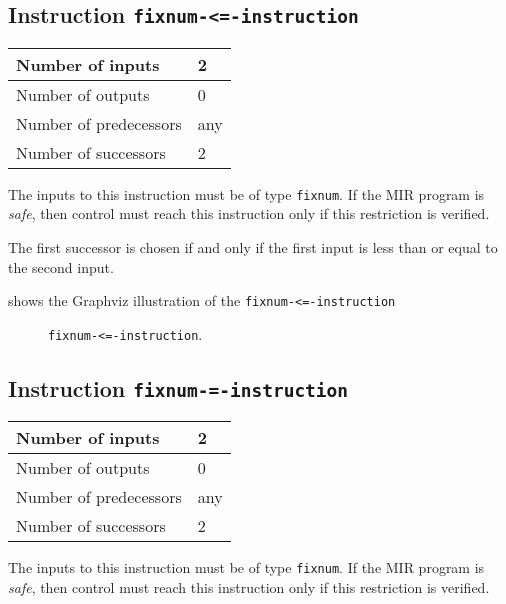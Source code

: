 \subsection{Instruction \texttt{fixnum-<=-instruction}}
\label{mir-instruction-fixnum-le}

\begin{tabular}{|l|l|}
\hline
Number of inputs & 2\\
\hline
Number of outputs & 0\\
\hline
Number of predecessors & any\\
\hline
Number of successors & 2\\
\hline
\end{tabular}

The inputs to this instruction must be of type \texttt{fixnum}.  If the
MIR program is \emph{safe}, then control must reach this instruction
only if this restriction is verified.

The first successor is chosen if and only if the first input is
less than or equal to the second input.

 shows the Graphviz illustration of the
\texttt{fixnum-<=-instruction}

\begin{figure}
\begin{center}
\end{center}
\caption{\label{fig-fixnum-le-instruction}
\texttt{fixnum-<=-instruction}.}
\end{figure}

\subsection{Instruction \texttt{fixnum-=-instruction}}
\label{mir-instruction-fixnum-equal}

\begin{tabular}{|l|l|}
\hline
Number of inputs & 2\\
\hline
Number of outputs & 0\\
\hline
Number of predecessors & any\\
\hline
Number of successors & 2\\
\hline
\end{tabular}

The inputs to this instruction must be of type \texttt{fixnum}.  If the
MIR program is \emph{safe}, then control must reach this instruction
only if this restriction is verified.

